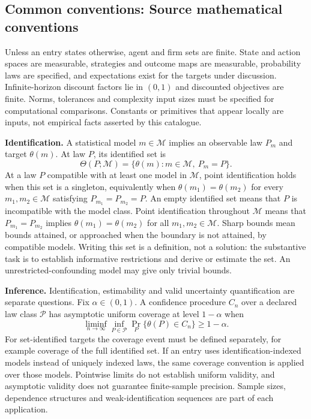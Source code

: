 \documentclass[11pt,a4paper]{article}
\begin{document}
\subsection*{Common conventions: Source mathematical conventions}

Unless an entry states otherwise, agent and firm sets are finite. State and action spaces are measurable, strategies and outcome maps are measurable, probability laws are specified, and expectations exist for the targets under discussion. Infinite-horizon discount factors lie in $(0,1)$ and discounted objectives are finite. Norms, tolerances and complexity input sizes must be specified for computational comparisons. Constants or primitives that appear locally are inputs, not empirical facts asserted by this catalogue.

\textbf{Identification.} A statistical model $m\in\mathcal M$ implies an observable law $P_m$ and target $\theta(m)$. At law $P$, its identified set is
\[
\Theta(P;\mathcal M)=\{\theta(m):m\in\mathcal M,\ P_m=P\}.
\]
At a law $P$ compatible with at least one model in $\mathcal M$, point identification holds when this set is a singleton, equivalently when $\theta(m_1)=\theta(m_2)$ for every $m_1,m_2\in\mathcal M$ satisfying $P_{m_1}=P_{m_2}=P$. An empty identified set means that $P$ is incompatible with the model class. Point identification throughout $\mathcal M$ means that $P_{m_1}=P_{m_2}$ implies $\theta(m_1)=\theta(m_2)$ for all $m_1,m_2\in\mathcal M$. Sharp bounds mean bounds attained, or approached when the boundary is not attained, by compatible models. Writing this set is a definition, not a solution: the substantive task is to establish informative restrictions and derive or estimate the set. An unrestricted-confounding model may give only trivial bounds.

\textbf{Inference.} Identification, estimability and valid uncertainty quantification are separate questions. Fix $\alpha\in(0,1)$. A confidence procedure $C_n$ over a declared law class $\mathcal P$ has asymptotic uniform coverage at level $1-\alpha$ when
\[
\liminf_{n\to\infty}\inf_{P\in\mathcal P}\Pr_P\{\theta(P)\in C_n\}\geq1-\alpha.
\]
For set-identified targets the coverage event must be defined separately, for example coverage of the full identified set. If an entry uses identification-indexed models instead of uniquely indexed laws, the same coverage convention is applied over those models. Pointwise limits do not establish uniform validity, and asymptotic validity does not guarantee finite-sample precision. Sample sizes, dependence structures and weak-identification sequences are part of each application.
\end{document}
